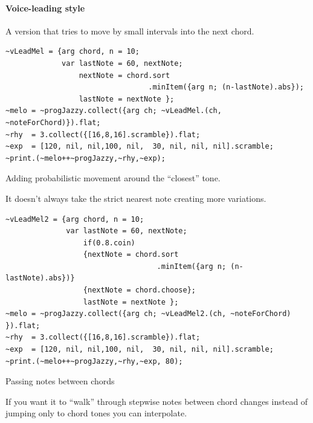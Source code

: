 \paragraph{Voice-leading style}\label{Voice-leading-style}
A version that tries to move by small intervals into the next chord.

\begin{lstlisting}[frame=single, caption=voice-leading style melody model function] 
~vLeadMel = {arg chord, n = 10;
             var lastNote = 60, nextNote;               
                 nextNote = chord.sort
                                 .minItem({arg n; (n-lastNote).abs});
                 lastNote = nextNote };
~melo = ~progJazzy.collect({arg ch; ~vLeadMel.(ch, ~noteForChord)}).flat;
~rhy  = 3.collect({[16,8,16].scramble}).flat;
~exp  = [120, nil, nil,100, nil,  30, nil, nil, nil].scramble;
~print.(~melo++~progJazzy,~rhy,~exp);
\end{lstlisting}

Adding probabilistic movement around the “closest” tone.

It doesn’t always take the strict nearest note creating more variations.

\begin{lstlisting}[frame=single, caption=voice-leading 2 style melody model function] 
~vLeadMel2 = {arg chord, n = 10;
              var lastNote = 60, nextNote;
                  if(0.8.coin) 
                  {nextNote = chord.sort
                                   .minItem({arg n; (n-lastNote).abs})} 
                  {nextNote = chord.choose};
                  lastNote = nextNote };
~melo = ~progJazzy.collect({arg ch; ~vLeadMel2.(ch, ~noteForChord) }).flat;
~rhy  = 3.collect({[16,8,16].scramble}).flat;
~exp  = [120, nil, nil,100, nil,  30, nil, nil, nil].scramble;
~print.(~melo++~progJazzy,~rhy,~exp, 80);
\end{lstlisting}

Passing notes between chords

If you want it to “walk” through stepwise notes between chord changes instead of jumping only to chord tones you can interpolate.


